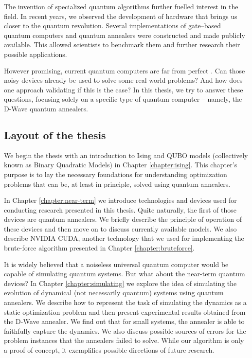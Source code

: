 The invention of specialized quantum algorithms further fuelled interest in the
field. In recent years, we observed the development of hardware that brings us
closer to the quantum revolution. Several implementations of gate--based
quantum computers \cite{ionq, bohnet} and quantum annealers \cite{johnson,
  dattani} were constructed and made publicly available. This allowed scientists
to benchmark them and further research their possible applications.

However promising, current quantum computers are far from perfect
\cite{pitfalls,preskill}. Can those noisy devices already be used to solve some
real-world problems? And how does one approach validating if this is the case?
In this thesis, we try to answer these questions, focusing solely on a specific
type of quantum computer -- namely, the D-Wave quantum annealers.

\subsection*{Layout of the thesis}

We begin the thesis with an introduction to Ising and QUBO models (collectively known as
Binary Quadratic Models) in Chapter \ref{chapter:ising}. This chapter's purpose
is to lay the necessary foundations for understanding optimization problems
that can be, at least in principle, solved using quantum annealers.

In Chapter \ref{chapter:near-term} we introduce technologies and devices used
for conducting research presented in this thesis. Quite naturally, the first of
those devices are quantum annealers. We briefly describe the principle of
operation of these devices and then move on to discuss currently available
models. We also describe NVIDIA CUDA, another technology that we used for
implementing the brute-force algorithm presented in Chapter
\ref{chapter:bruteforce}.

It is widely believed that a noiseless universal quantum computer would be
capable of simulating quantum systems. But what about the near-term quantum
devices? In Chapter \ref{chapter:simulating} we explore the idea of simulating
the evolution of dynamical (not necessarily quantum) systems using quantum
annealers. We describe how to represent the task of simulating the dynamics as
a static optimization problem and then present experimental results obtained
from the D-Wave annealer. We find out that for small systems, the annealer is
able to faithfully capture the dynamics. We also discuss possible sources of
errors for the problem instances that the annealers failed to solve. While our
algorithm is only a proof of concept, it exemplifies possible directions of
future research.

